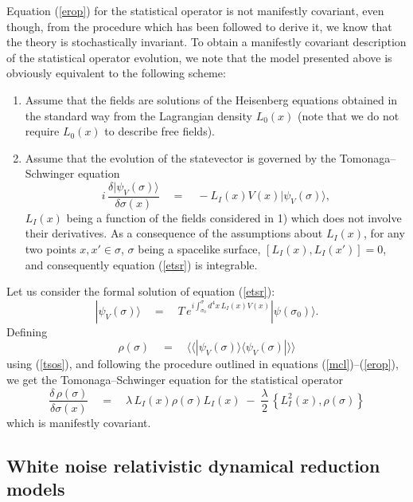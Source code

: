 \documentclass[10pt,a4paper]{article}
\newcommand{\llangle}{\langle\!\langle}
\newcommand{\rrangle}{\rangle\!\rangle}
\begin{document}
Equation (\ref{erop}) for the statistical operator is not
manifestly covariant, even though, from the procedure which has
been followed to derive it, we know that the theory is
stochastically invariant. To obtain a manifestly covariant
description of the statistical operator evolution, we note that
the model presented above is obviously equivalent to the following
scheme:
\begin{enumerate}
\item Assume that the fields are solutions of the Heisenberg
equations obtained in the standard way from the Lagrangian density
$L_{0}(x)$ (note that we do not require $L_{0}(x)$ to describe
free fields).
\item Assume that the evolution of the statevector is governed by
the Tomonaga--Schwinger equation
\begin{equation} \label{etsr}
i\,\frac{\delta |\psi_{V}(\sigma)\rangle}{\delta\sigma(x)} \quad =
\quad - L_{I}(x)V(x) |\psi_{V}(\sigma)\rangle,
\end{equation}
$L_{I}(x)$ being a function of the fields considered in 1) which
does not involve their derivatives. As a consequence of the
assumptions about $L_{I}(x)$, for any two points $x, x' \in
\sigma$, $\sigma$ being a spacelike surface, $[L_{I}(x),
L_{I}(x')] = 0$, and consequently equation (\ref{etsr}) is
integrable.
\end{enumerate}

Let us consider the formal solution of equation (\ref{etsr}):
\begin{equation}
|\psi_{V}(\sigma)\rangle \quad = \quad T\, e^{\displaystyle
i\int_{\sigma_{0}}^{\sigma} d^{4}x\, L_{I}(x) V(x)}
|\psi(\sigma_{0})\rangle.
\end{equation}
Defining
\begin{equation} \label{tsos}
\rho(\sigma) \quad = \quad \llangle|\psi_{V}(\sigma)\rangle
\langle\psi_{V}(\sigma)|\rrangle
\end{equation}
using (\ref{tsos}), and following the procedure outlined in
equations (\ref{mcl})--(\ref{erop}), we get the
Tomonaga--Schwinger equation for the statistical operator
\begin{equation} \label{cuat}
\frac{\delta\, \rho(\sigma)}{\delta\sigma(x)} \quad = \quad
\lambda\, L_{I}(x) \rho(\sigma) L_{I}(x) \; - \;
\frac{\lambda}{2}\, \left\{ L_{I}^{2}(x), \rho(\sigma) \right\}
\end{equation}
which is manifestly covariant.


\subsection{White noise relativistic dynamical reduction models}
\label{sec93}
\end{document}
